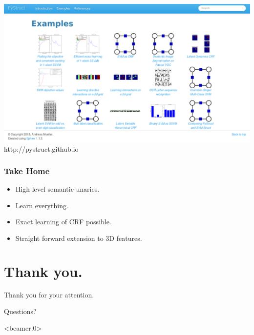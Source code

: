 \documentclass[final,ignorenonframetext,compress]{beamer}
\begin{document}
    \begin{frame}
        \begin{center}
            \includegraphics[width=\linewidth]{images/example_gallery}\\
            http://pystruct.github.io
        \end{center}
    \end{frame}

    \begin{frame}
        \frametitle{Take Home}
        \begin{itemize}
            \item High level semantic unaries.
            \item Learn everything.
            \item Exact learning of CRF possible.
            \item Straight forward extension to 3D features.
        \end{itemize}
    \end{frame}
    
    \section*{Thank you.}
    \begin{frame}
        \begin{center}
            Thank you for your attention.

            Questions?
        \end{center}
    \end{frame}
    \begin{frame}<beamer:0>
        
        
    \end{frame}

	
\end{document}
